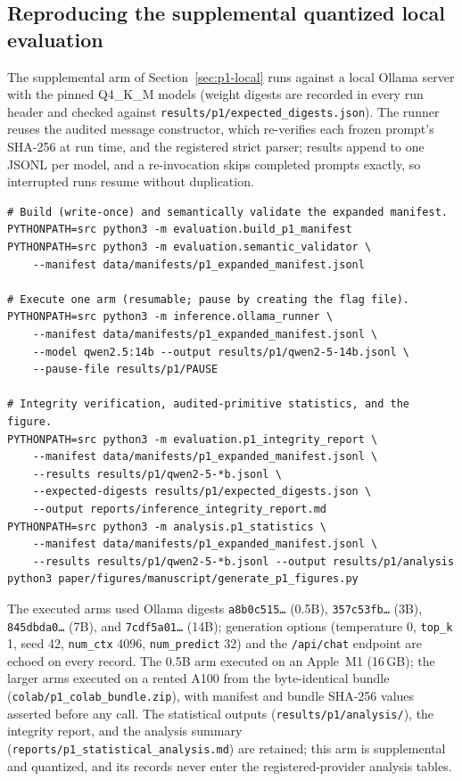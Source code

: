 \subsection{Reproducing the supplemental quantized local evaluation}
\label{app:p1-repro}

The supplemental arm of Section~\ref{sec:p1-local} runs against a local Ollama server with the pinned
Q4\_K\_M models (weight digests are recorded in every run header and checked against
\texttt{results/p1/expected\_digests.json}). The runner reuses the audited message constructor, which
re-verifies each frozen prompt's SHA-256 at run time, and the registered strict parser; results append to
one JSONL per model, and a re-invocation skips completed prompts exactly, so interrupted runs resume
without duplication.

\begin{small}
\begin{verbatim}
# Build (write-once) and semantically validate the expanded manifest.
PYTHONPATH=src python3 -m evaluation.build_p1_manifest
PYTHONPATH=src python3 -m evaluation.semantic_validator \
    --manifest data/manifests/p1_expanded_manifest.jsonl

# Execute one arm (resumable; pause by creating the flag file).
PYTHONPATH=src python3 -m inference.ollama_runner \
    --manifest data/manifests/p1_expanded_manifest.jsonl \
    --model qwen2.5:14b --output results/p1/qwen2-5-14b.jsonl \
    --pause-file results/p1/PAUSE

# Integrity verification, audited-primitive statistics, and the figure.
PYTHONPATH=src python3 -m evaluation.p1_integrity_report \
    --manifest data/manifests/p1_expanded_manifest.jsonl \
    --results results/p1/qwen2-5-*b.jsonl \
    --expected-digests results/p1/expected_digests.json \
    --output reports/inference_integrity_report.md
PYTHONPATH=src python3 -m analysis.p1_statistics \
    --manifest data/manifests/p1_expanded_manifest.jsonl \
    --results results/p1/qwen2-5-*b.jsonl --output results/p1/analysis
python3 paper/figures/manuscript/generate_p1_figures.py
\end{verbatim}
\end{small}

The executed arms used Ollama digests \texttt{a8b0c515\ldots} (0.5B), \texttt{357c53fb\ldots} (3B),
\texttt{845dbda0\ldots} (7B), and \texttt{7cdf5a01\ldots} (14B); generation options (temperature 0,
\texttt{top\_k} 1, seed 42, \texttt{num\_ctx} 4096, \texttt{num\_predict} 32) and the
\texttt{/api/chat} endpoint are echoed on every record. The 0.5B arm executed on an Apple~M1 (16\,GB);
the larger arms executed on a rented A100 from the byte-identical bundle
(\texttt{colab/p1\_colab\_bundle.zip}), with manifest and bundle SHA-256 values asserted before any call.
The statistical outputs (\texttt{results/p1/analysis/}), the integrity report, and the analysis summary
(\texttt{reports/p1\_statistical\_analysis.md}) are retained; this arm is supplemental and quantized, and
its records never enter the registered-provider analysis tables.

